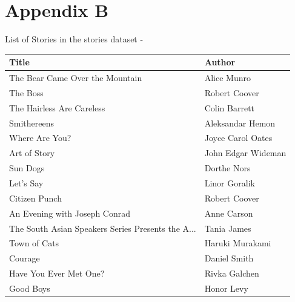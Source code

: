 \documentclass[11pt]{article}
\begin{document}
\section{Appendix B}
\label{appendix:b}
List of Stories in the stories dataset -
\begin{longtable}{l|l}
  \hline
  Title                                             & Author                     \\ \hline
  \endfirsthead
  \endhead
  The Bear Came Over the Mountain                   & Alice Munro                \\ \hline
  The Boss                                          & Robert Coover              \\ \hline
  The Hairless Are Careless                         & Colin Barrett              \\ \hline
  Smithereens                                       & Aleksandar Hemon           \\ \hline
  Where Are You?                                    & Joyce Carol Oates          \\ \hline
  Art of Story                                      & John Edgar Wideman         \\ \hline
  Sun Dogs                                          & Dorthe Nors                \\ \hline
  Let’s Say                                         & Linor Goralik              \\ \hline
  Citizen Punch                                     & Robert Coover              \\ \hline
  An Evening with Joseph Conrad                     & Anne Carson                \\ \hline
  The South Asian Speakers Series Presents the A... & Tania James                \\ \hline
  Town of Cats                                      & Haruki Murakami            \\ \hline
  Courage                                           & Daniel Smith               \\ \hline
  Have You Ever Met One?                            & Rivka Galchen              \\ \hline
  Good Boys                                         & Honor Levy                 \\ \hline

\end{longtable}
\end{document}
